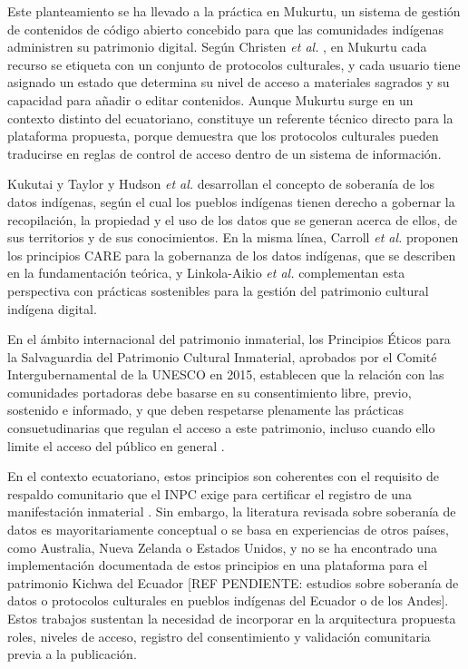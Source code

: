 Este planteamiento se ha llevado a la práctica en Mukurtu, un sistema de gestión de contenidos de código abierto concebido para que las comunidades indígenas administren su patrimonio digital. Según Christen \textit{et al.} \cite{christen2017mukurtu}, en Mukurtu cada recurso se etiqueta con un conjunto de protocolos culturales, y cada usuario tiene asignado un estado que determina su nivel de acceso a materiales sagrados y su capacidad para añadir o editar contenidos. Aunque Mukurtu surge en un contexto distinto del ecuatoriano, constituye un referente técnico directo para la plataforma propuesta, porque demuestra que los protocolos culturales pueden traducirse en reglas de control de acceso dentro de un sistema de información.

Kukutai y Taylor \cite{kukutai2016indigenous} y Hudson \textit{et al.} \cite{hudson2023indigenous} desarrollan el concepto de soberanía de los datos indígenas, según el cual los pueblos indígenas tienen derecho a gobernar la recopilación, la propiedad y el uso de los datos que se generan acerca de ellos, de sus territorios y de sus conocimientos. En la misma línea, Carroll \textit{et al.} \cite{carroll2020care} proponen los principios CARE para la gobernanza de los datos indígenas, que se describen en la fundamentación teórica, y Linkola-Aikio \textit{et al.} \cite{linkola2025digital} complementan esta perspectiva con prácticas sostenibles para la gestión del patrimonio cultural indígena digital.

En el ámbito internacional del patrimonio inmaterial, los Principios Éticos para la Salvaguardia del Patrimonio Cultural Inmaterial, aprobados por el Comité Intergubernamental de la UNESCO en 2015, establecen que la relación con las comunidades portadoras debe basarse en su consentimiento libre, previo, sostenido e informado, y que deben respetarse plenamente las prácticas consuetudinarias que regulan el acceso a este patrimonio, incluso cuando ello limite el acceso del público en general \cite{unesco2015ethical}.

En el contexto ecuatoriano, estos principios son coherentes con el requisito de respaldo comunitario que el INPC exige para certificar el registro de una manifestación inmaterial \cite{inpc2026sipce}. Sin embargo, la literatura revisada sobre soberanía de datos es mayoritariamente conceptual o se basa en experiencias de otros países, como Australia, Nueva Zelanda o Estados Unidos, y no se ha encontrado una implementación documentada de estos principios en una plataforma para el patrimonio Kichwa del Ecuador [REF PENDIENTE: estudios sobre soberanía de datos o protocolos culturales en pueblos indígenas del Ecuador o de los Andes]. Estos trabajos sustentan la necesidad de incorporar en la arquitectura propuesta roles, niveles de acceso, registro del consentimiento y validación comunitaria previa a la publicación.

